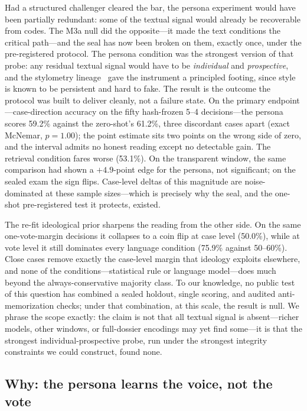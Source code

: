 Had a structured challenger cleared the bar, the persona experiment
would have been partially redundant: some of the textual signal
would already be recoverable from codes. The M3a null did the
opposite---it made the text conditions the critical path---and the
seal has now been broken on them, exactly once, under the
pre-registered protocol. The persona condition was the strongest
version of that probe: any residual textual signal would have to be
\emph{individual} and \emph{prospective}, and the stylometry
lineage~\citep{mosteller1964,juola2006} gave the instrument a
principled footing, since style is known to be persistent and hard
to fake. The result is the outcome the protocol was built to
deliver cleanly, not a failure state. On the primary
endpoint---case-direction accuracy on the fifty hash-frozen 5--4
decisions---the persona scores 59.2\% against the zero-shot's
61.2\%, three discordant cases apart (exact McNemar, $p=1.00$); the
point estimate sits two points on the wrong side of zero, and the
interval admits no honest reading except no detectable gain. The
retrieval condition fares worse (53.1\%). On the transparent
window, the same comparison had shown a $+4.9$-point edge for the
persona, not significant; on the sealed exam the sign flips.
Case-level deltas of this magnitude are noise-dominated at these
sample sizes---which is precisely why the seal, and the one-shot
pre-registered test it protects, existed.

The re-fit ideological prior sharpens the reading from the other
side. On the same one-vote-margin decisions it collapses to a coin
flip at case level (50.0\%), while at vote level it still dominates
every language condition (75.9\% against 50--60\%). Close cases
remove exactly the case-level margin that ideology exploits
elsewhere, and none of the conditions---statistical rule or
language model---does much beyond the always-conservative majority
class. To our knowledge, no public test of this question has combined
a sealed holdout, single scoring, and audited anti-memorization
checks; under that combination, at this scale, the result is null. We
phrase the scope exactly: the claim is not that all textual signal is
absent---richer models, other windows, or full-dossier encodings
may yet find some---it is that the strongest individual-prospective
probe, run under the strongest integrity constraints we could
construct, found none.

\subsection{Why: the persona learns the voice, not the vote}

